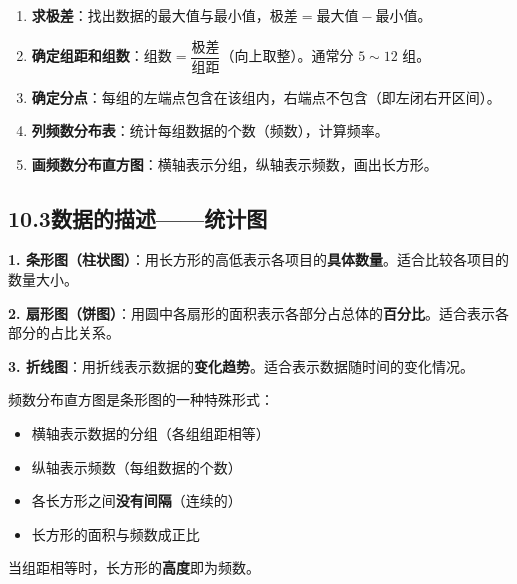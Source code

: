 \documentclass[12pt, a4paper]{ctexart}
\begin{document}
\begin{knowledgebox}[10.2.2 频数分布表的制作步骤]
\begin{enumerate}[leftmargin=2em]
  \item \textbf{求极差}：找出数据的最大值与最小值，$\text{极差} = \text{最大值} - \text{最小值}$。
  \item \textbf{确定组距和组数}：$\text{组数} = \dfrac{\text{极差}}{\text{组距}}$（向上取整）。通常分 $5 \sim 12$ 组。
  \item \textbf{确定分点}：每组的左端点包含在该组内，右端点不包含（即左闭右开区间）。
  \item \textbf{列频数分布表}：统计每组数据的个数（频数），计算频率。
  \item \textbf{画频数分布直方图}：横轴表示分组，纵轴表示频数，画出长方形。
\end{enumerate}
\end{knowledgebox}

\subsection*{10.3\quad 数据的描述——统计图}

\begin{knowledgebox}[10.3.1 三种常见统计图]
\textbf{1. 条形图（柱状图）}：用长方形的高低表示各项目的\textbf{具体数量}。适合比较各项目的数量大小。

\textbf{2. 扇形图（饼图）}：用圆中各扇形的面积表示各部分占总体的\textbf{百分比}。适合表示各部分的占比关系。

\textbf{3. 折线图}：用折线表示数据的\textbf{变化趋势}。适合表示数据随时间的变化情况。
\end{knowledgebox}

\begin{knowledgebox}[10.3.2 频数分布直方图]
频数分布直方图是条形图的一种特殊形式：

\begin{itemize}[leftmargin=2em]
  \item 横轴表示数据的分组（各组组距相等）
  \item 纵轴表示频数（每组数据的个数）
  \item 各长方形之间\textbf{没有间隔}（连续的）
  \item 长方形的面积与频数成正比
\end{itemize}

当组距相等时，长方形的\textbf{高度}即为频数。
\end{knowledgebox}
\end{document}
